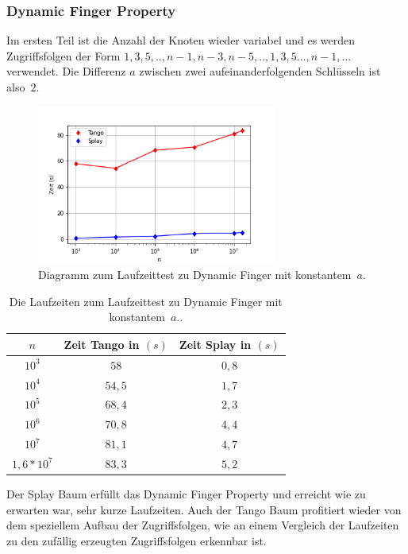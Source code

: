 \documentclass[a4paper,12pt]{article}
\begin{document}
\subsubsection{Dynamic Finger Property}
Im ersten Teil ist die Anzahl der Knoten wieder variabel und es werden Zugriffsfolgen der Form  $1, 3, 5,..,n-1, n-3, n-5, ..,1, 3, 5..., n-1,...$ verwendet. Die Differenz $a$ zwischen zwei aufeinanderfolgenden Schlüsseln ist \mbox{also $2$}.
\begin{figure}[H]
	\centering
	\includegraphics[width=0.7\textwidth]{Medien/laufzeittest/diagramm/dynamicfinger}
	\caption{Diagramm zum Laufzeittest zu Dynamic Finger mit \mbox{konstantem $a$.}}
\end{figure}
\begin{table}[H]
	\begin{center}
		\begin{tabular}[c]{|c|c|c|}
			\hline
			$n$ & Zeit Tango in $\left(s\right)$ &Zeit Splay in $\left(s\right)$ \\
			\hline
			$10^3$ & $58$ &$0,8$ \\
			\hline
			$10^4$  & $54,5$ &$1,7$  \\
			\hline
			$10^5$  & $68,4$ &$2,3$  \\
			\hline
			$10^6$  & $70,8$ &$4,4$  \\
			\hline
			$10^7$  & $81,1$ &$4,7$  \\
			\hline
			$1,6 *10^7$  & $83,3$ &$5,2$  \\
			\hline
		\end{tabular}
		\caption{Die Laufzeiten zum Laufzeittest zu Dynamic Finger mit \mbox{konstantem $a$.}.} 
	\end{center}
\end{table}
\noindent Der Splay Baum erfüllt das Dynamic Finger Property und erreicht wie zu erwarten war, sehr kurze Laufzeiten. Auch der Tango Baum profitiert wieder von dem speziellem Aufbau der Zugriffsfolgen, wie an einem Vergleich der Laufzeiten zu den zufällig erzeugten Zugriffsfolgen erkennbar ist. 
\end{document}
